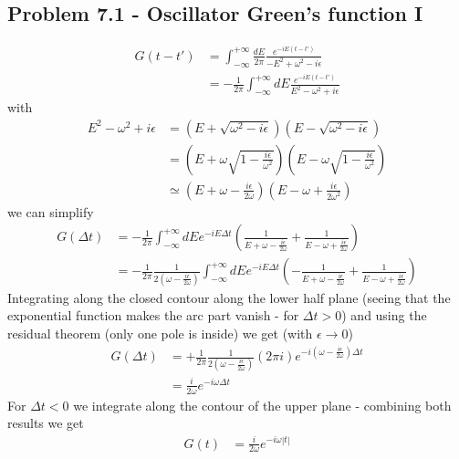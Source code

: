 \documentclass[../main.tex]{subfiles}
\begin{document}
\subsection{Problem 7.1 - Oscillator Green's function I}
\begin{align}
G(t-t')&=\int_{-\infty}^{+\infty}\frac{dE}{2\pi}\frac{e^{-iE(t-t')}}{-E^2+\omega^2-i\epsilon}\\
&=-\frac{1}{2\pi}\int_{-\infty}^{+\infty}dE\frac{e^{-iE(t-t')}}{E^2-\omega^2+i\epsilon}
\end{align}
with
\begin{align}
E^2-\omega^2+i\epsilon
&=(E+\sqrt{\omega^2-i\epsilon})(E-\sqrt{\omega^2-i\epsilon})\\
&=\left(E+\omega\sqrt{1-\frac{i\epsilon}{\omega^2}}\right)\left(E-\omega\sqrt{1-\frac{i\epsilon}{\omega^2}}\right)\\
&\simeq\left(E+\omega-\frac{i\epsilon}{2\omega}\right)\left(E-\omega+\frac{i\epsilon}{2\omega^2}\right)
\end{align}
we can simplify
\begin{align}
G(\Delta t)
&=-\frac{1}{2\pi}\int_{-\infty}^{+\infty}dEe^{-iE\Delta t}\left(\frac{1}{E+\omega-\frac{i\epsilon}{2\omega}}+\frac{1}{E-\omega+\frac{i\epsilon}{2\omega}}\right)\\
&=-\frac{1}{2\pi}\frac{1}{2\left(\omega-\frac{i\epsilon}{2\omega}\right)}\int_{-\infty}^{+\infty}dEe^{-iE\Delta t}\left(-\frac{1}{E+\omega-\frac{i\epsilon}{2\omega}}+\frac{1}{E-\omega+\frac{i\epsilon}{2\omega}}\right)
\end{align}
Integrating along the closed contour along the lower half plane (seeing that the exponential function makes the arc part vanish - for $\Delta t>0$) and using the residual theorem (only one pole is inside) we get (with $\epsilon\rightarrow0$)
\begin{align}
G(\Delta t)
&=+\frac{1}{2\pi}\frac{1}{2\left(\omega-\frac{i\epsilon}{2\omega}\right)}(2\pi i)e^{-i(\omega-\frac{i\epsilon}{2\omega})\Delta t}\\
&=\frac{i}{2\omega}e^{-i\omega\Delta t}
\end{align}
For $\Delta t<0$ we integrate along the contour of the upper plane - combining both results we get
\begin{align}
G(t)&=\frac{i}{2\omega}e^{-i\omega|t|}
\end{align}
\end{document}
